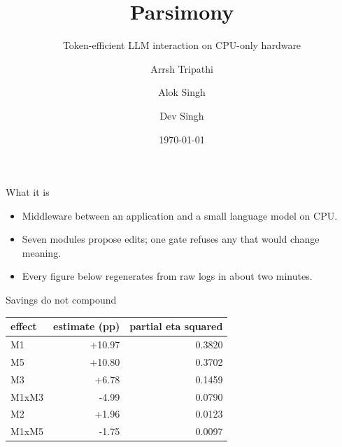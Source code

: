 \documentclass[aspectratio=169]{beamer}
\title{Parsimony}
\subtitle{Token-efficient LLM interaction on CPU-only hardware}
\author{Arrsh Tripathi \and Alok Singh \and Dev Singh}
\date{\today}
\begin{document}
\maketitle

\begin{frame}{What it is}
  \begin{itemize}
    \item Middleware between an application and a small language model on CPU.
    \item Seven modules propose edits; one gate refuses any that would change meaning.
    \item Every figure below regenerates from raw logs in about two minutes.
  \end{itemize}
\end{frame}

\begin{frame}{Savings do not compound}
  \begin{center}
  \begin{tabular}{lrr}
    \toprule
    \textbf{effect} & \textbf{estimate (pp)} & \textbf{partial eta squared} \\
    \midrule
      M1 & +10.97 & 0.3820 \\
      M5 & +10.80 & 0.3702 \\
      M3 & +6.78 & 0.1459 \\
      M1xM3 & -4.99 & 0.0790 \\
      M2 & +1.96 & 0.0123 \\
      M1xM5 & -1.75 & 0.0097 \\
    \bottomrule
  \end{tabular}
  \end{center}
\end{frame}
\end{document}
